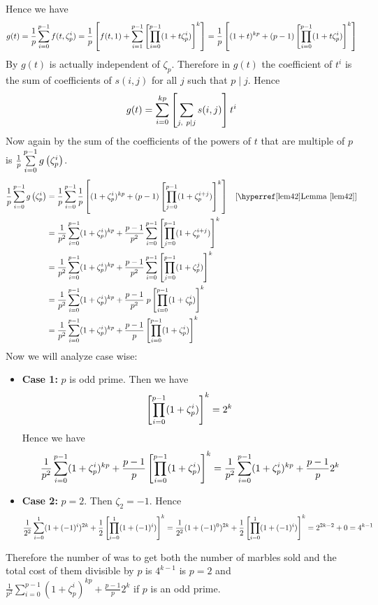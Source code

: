 \documentclass[a4paper, 11pt]{article}
\begin{document}
{Hence we have $$g(t)=\frac1p\sum\limits_{i=0}^{p-1}f(t,\zeta_p^i)=\frac1p\left[f(t,1)+\sum_{i=1}^{p-1}\left[ \prod\limits_{i=0}^{p-1}(1+t\zeta_p^i)\right]^k\right]=\frac1p\left[ (1+t)^{kp} +(p-1)\left[ \prod\limits_{i=0}^{p-1}(1+t\zeta_p^i)\right]^k\right]$$By  $g(t)$ is actually independent of $\zeta_p$. Therefore in $g(t)$ the coefficient of $t^i$ is the sum of coefficients of $s(i,j)$ for all $j$ such that $p\mid j$. Hence $$g(t)=\sum_{i=0}^{kp}\lt[\sum_{j,\ p\mid j}s(i,j)\rt]t^i$$Now again by  the sum of the coefficients of the powers of $t$ that are multiple of $p$ is $\frac1p\sum\limits_{i=0}^{p-1}g\left(\zeta_p^i\right)$. \begin{align*}
	\frac1p\sum\limits_{i=0}^{p-1}g\lt(\zeta_p^i\rt) & = \frac1p\sum\limits_{i=0}^{p-1}\frac1p\lt[ (1+\zeta_p^{i})^{kp} +(p-1)\lt[ \prod\limits_{j=0}^{p-1}(1+\zeta_p^{i+j})\rt]^k\rt] & [\text{\lemref{lem42}}]\\
	& = \frac1{p^2}\sum\limits_{i=0}^{p-1}(1+\zeta_p^{i})^{kp}+\frac{p-1}{p^2}\sum\limits_{i=0}^{p-1}\lt[ \prod\limits_{j=0}^{p-1}(1+\zeta_p^{i+j})\rt]^k\\
	& = \frac1{p^2}\sum\limits_{i=0}^{p-1}(1+\zeta_p^{i})^{kp}+\frac{p-1}{p^2}\sum\limits_{i=0}^{p-1}\lt[ \prod\limits_{j=0}^{p-1}(1+\zeta_p^{j})\rt]^k\\
	& = \frac1{p^2}\sum\limits_{i=0}^{p-1}(1+\zeta_p^{i})^{kp}+\frac{p-1}{p^2}\;p\lt[ \prod\limits_{i=0}^{p-1}(1+\zeta_p^{i})\rt]^k\\
	& = \frac1{p^2}\sum\limits_{i=0}^{p-1}(1+\zeta_p^{i})^{kp}+\frac{p-1}{p}\lt[ \prod\limits_{i=0}^{p-1}(1+\zeta_p^{i})\rt]^k
\end{align*}Now we will analyze case wise:
\begin{itemize}
	\item \textbf{Case 1:} $p$ is odd prime. Then we have $$\left[ \prod\limits_{i=0}^{p-1}(1+\zeta_p^{i})\right]^k=2^k$$Hence we have $$\frac1{p^2}\sum\limits_{i=0}^{p-1}(1+\zeta_p^{i})^{kp}+\frac{p-1}{p}\left[ \prod\limits_{i=0}^{p-1}(1+\zeta_p^{i})\right]^k=\frac1{p^2}\sum\limits_{i=0}^{p-1}(1+\zeta_p^{i})^{kp}+\frac{p-1}{p}2^k$$
	\item \textbf{Case 2:} $p=2$. Then $\zeta_2=-1$. Hence $$\frac1{2^2}\sum\limits_{i=0}^{1}(1+(-1)^{i})^{2k}+\frac{1}{2}\left[ \prod\limits_{i=0}^{1}(1+(-1)^{i})\right]^k=\frac1{2^2}(1+(-1)^{0})^{2k}+\frac{1}{2}\left[ \prod\limits_{i=0}^{1}(1+(-1)^{i})\right]^{k}=2^{2k-2}+0=4^{k-1}$$
\end{itemize}Therefore the number of was to get both the number of marbles sold and the total cost of them divisible by $p$ is $4^{k-1}$ is $p=2$ and $\frac1{p^2}\sum\limits_{i=0}^{p-1}(1+\zeta_p^{i})^{kp}+\frac{p-1}{p}2^k$ if $p$ is an odd prime. 
}\parinf
\end{document}
